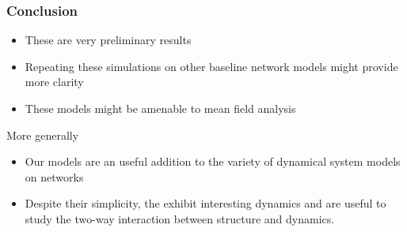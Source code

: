 \documentclass{beamer}
\begin{document}
\begin{frame}[t]
\frametitle{Conclusion}
\begin{itemize}
\item These are very preliminary results 
\item Repeating these simulations on other baseline network models might provide more clarity
\item These models might be amenable to mean field analysis 
\end{itemize}
More generally
\begin{itemize}
\item Our models are an useful addition to the variety of dynamical system models on networks 
\item Despite their simplicity, the exhibit interesting dynamics and are useful to study the two-way interaction between structure and dynamics.  
\end{itemize}
\end{frame}
\end{document}
